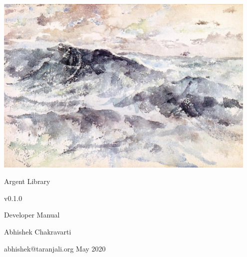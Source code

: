 \documentclass[a4paper, twocolumn]{report}
\begin{document}
\begin{titlepage}
  \centering
  \includegraphics[width=0.95\textwidth]{the-great-sea.jpg}\par \vspace{1em}
  \Huge Argent Library \par \vspace{0.5em} \large v0.1.0 \par \vspace{0.5em} 
      \LARGE Developer Manual \par \vspace{5em} Abhishek Chakravarti \par
      \vspace{0.5em} \small abhishek@taranjali.org \vfill \large May 2020
\end{titlepage}

\tableofcontents
\listoftables
\listoffigures
\listofalgorithms
\lstlistoflistings






\begin{appendices}
  
\end{appendices}

\clearpage
\printindex
\end{document}
